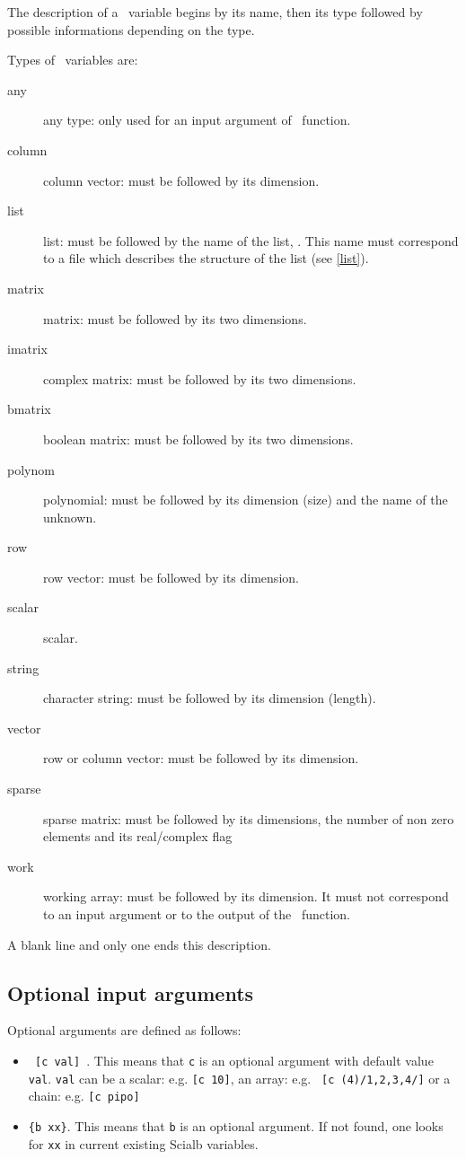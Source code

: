 \documentclass[11pt]{article}
\begin{document}
The description of a \SCI\ variable begins by its name, then its type followed
by possible informations depending on the type.

Types of \SCI\ variables are:
\begin{description}
  \item[any] any type: only used for an input argument of \SCI\ function.
  \item[column] column vector: must be followed by its dimension.
  \item[list] list: must be followed by the name of the list,
. This name must correspond to a file 
which describes the structure of the list (see \ref{list}).
  \item[matrix] matrix: must be followed by its two dimensions.
  \item[imatrix] complex matrix: must be followed by its two
  dimensions.
  \item[bmatrix] boolean matrix: must be followed by its two dimensions.
  \item[polynom] polynomial: must be followed by its dimension (size) and the
name of the unknown.
  \item[row] row vector: must be followed by its dimension.
  \item[scalar] scalar.
  \item[string] character string: must be followed by its dimension
(length).
  \item[vector] row or column vector: must be followed by its
  dimension.
  \item[sparse] sparse matrix: must be followed by its
  dimensions, the number of non zero elements and its real/complex flag

  \item[work] working array: must be followed by its dimension. It must not
correspond to an input argument or to the output of the \SCI\ function.
\end{description}

\smallskip

A blank line and only one ends this description.

\subsection{Optional input arguments}

Optional arguments are defined as follows:
\begin{itemize}
\item{
\verb! [c val] !. This means that \verb!c! is an optional argument with
default value \verb!val!.  \verb!val! can be a scalar: e.g. \verb![c 10]!, 
an array: e.g. \verb! [c (4)/1,2,3,4/]! or a chain: e.g. \verb![c pipo]! 
}
\item{
\verb!{b xx}!. This means that \verb!b! is an optional argument.
If not found, one looks for \verb!xx! in current existing Scialb variables.
}
\end{itemize}
\end{document}
